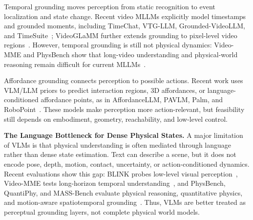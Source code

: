 Temporal grounding moves perception from static recognition to event localization and state change. Recent video MLLMs explicitly model timestamps and grounded moments, including TimeChat, VTG-LLM, Grounded-VideoLLM, and TimeSuite~\citep{ren2024timechat,guo2025vtg,wang2024grounded,zeng2025timesuite}; VideoGLaMM further extends grounding to pixel-level video regions~\citep{munasinghe2025videoglamm}. However, temporal grounding is still not physical dynamics: Video-MME and PhysBench show that long-video understanding and physical-world reasoning remain difficult for current MLLMs~\citep{fu2026video,chow2025physbench}.

Affordance grounding connects perception to possible actions. Recent work uses VLM/LLM priors to predict interaction regions, 3D affordances, or language-conditioned affordance points, as in AffordanceLLM, PAVLM, Palm, and RoboPoint~\citep{qian2024affordancellm,liu2025pavlm,liu2026palm,yuan2024robopoint}. These models make perception more action-relevant, but feasibility still depends on embodiment, geometry, reachability, and low-level control.


\noindent\textbf{The Language Bottleneck for Dense Physical States.}
A major limitation of VLMs is that physical understanding is often mediated through language rather than dense state estimation. Text can describe a scene, but it does not encode pose, depth, motion, contact, uncertainty, or action-conditioned dynamics. Recent evaluations show this gap: BLINK probes low-level visual perception~\citep{fu2024blink}, Video-MME tests long-horizon temporal understanding~\citep{fu2025video}, and PhysBench, QuantiPhy, and MASS-Bench evaluate physical reasoning, quantitative physics, and motion-aware spatiotemporal grounding~\citep{chow2025physbench,puyin2025quantiphy,wu2025mass}. Thus, VLMs are better treated as perceptual grounding layers, not complete physical world models.
